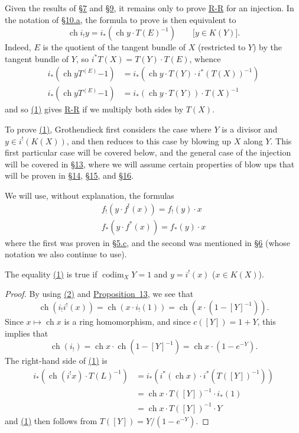 \documentclass{article}
\theoremstyle{plain}
\newenvironment{proposition}[1]
    {\renewcommand\theinnerproposition{#1}\innerproposition}
    {\endinnerproposition}
\theoremstyle{definition}
\DeclareMathOperator{\ch}{ch}
\DeclareMathOperator{\codim}{codim}
\newcommand{\oldpage}[1]{\marginpar{\footnotesize$\Big\vert$ \textit{p.~#1}}}
\begin{document}
Given the results of \hyperref[section7]{\S7} and \hyperref[section9]{\S9}, it remains only to prove \hyperref[theoremriemannroch]{R-R} for an injection.
In the notation of \hyperref[subsection10a]{\S10.a}, the formula to prove is then equivalent to
\[
\label{section11equation1}
  \ch i_!y = i_*(\ch y\cdot T(E)^{-1})
  \qquad\mbox{[$y\in K(Y)$].}
  \tag{1}
\]
Indeed, $E$ is the quotient of the tangent bundle of $X$ (restricted to $Y$) by the tangent bundle of $Y$, so $i^*T(X) = T(Y)\cdot T(E)$, whence
\begin{align*}
  i_*(\ch y T^(E){-1}) &= i_*(\ch y\cdot T(Y)\cdot i^*(T(X))^{-1})
\\i_*(\ch y T^(E){-1}) &= i_*(\ch y\cdot T(Y))\cdot T(X)^{-1}
\end{align*}
and so \hyperref[section11equation1]{(1)} gives \hyperref[theoremriemannroch]{R-R} if we multiply both sides by $T(X)$.

To prove \hyperref[section11equation1]{(1)}, Grothendieck first considers the case where $Y$ is a divisor and $y\in i^!(K(X))$, and then reduces to this case by blowing up $X$ along $Y$.
This first particular case will be covered below, and the general case of the injection will be covered in \hyperref[section13]{\S13}, where we will assume certain properties of blow ups that will be proven in \hyperref[section14]{\S14}, \hyperref[section15]{\S15}, and \hyperref[section16]{\S16}.

We will use, without explanation, the formulas
\[
\label{section11equation2}
  \begin{aligned}
    f_!(y\cdot f^!(x)) = f_!(y)\cdot x
  \\f_*(y\cdot f^*(x)) = f_*(y)\cdot x
  \end{aligned}
  \tag{2}
\]
where the first was proven in \hyperref[subsection5c]{\S5.c}, and the second was mentioned in \hyperref[section6]{\S6} (whose notation we also continue to use).

\begin{proposition}{14}
\label{proposition14}
  The equality \hyperref[section11equation1]{(1)} is true if $\codim_XY=1$ and $y=i^!(x)$ ($x\in K(X)$).
\end{proposition}

\begin{proof}
  By using \hyperref[section11equation2]{(2)} and \hyperref[proposition13]{Proposition~13}, we see that
  \[
    \ch(i_!i^!(x)) = \ch(x\cdot i_!(1)) = \ch(x\cdot(1-[Y]^{-1})).
  \]
  Since $x\mapsto\ch x$ is a ring homomorphism, and since $c([Y])=1+Y$,
\oldpage{125}
  this implies that
  \[
    \ch(i_!) = \ch x\cdot\ch(1-[Y]^{-1}) = \ch x\cdot(1-e^{-Y}).
  \]
  The right-hand side of \hyperref[section11equation1]{(1)} is
  \begin{align*}
    i_*(\ch(i^!x)\cdot T(L)^{-1})
    &= i_*(i^*(\ch x)\cdot i^*(T([Y])^{-1}))
  \\&= \ch x\cdot T([Y])^{-1}\cdot i_*(1)
  \\&= \ch x\cdot T([Y])^{-1}\cdot Y
  \end{align*}
  and \hyperref[section11equation1]{(1)} then follows from $T([Y])=Y/(1-e^{-Y})$.
\end{proof}
\end{document}
